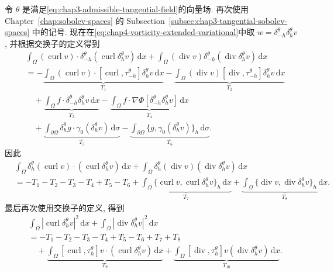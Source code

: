 \begin{Proof}
\begin{itemize}
令 $\theta$ 是满足\eqref{eq:chap3-admissible-tangential-field}的向量场. 再次使用 Chapter~\ref{chap:sobolev-spaces} 的 Subsection~\ref{subsec:chap3-tangential-sobolev-spaces} 中的记号. 现在在\eqref{eq:chap4-vorticity-extended-variational}中取 $w=\delta_{-h}^\theta\delta_h^\theta v$, 并根据交换子的定义得到
\begin{align*}
 &\int_\Omega(\operatorname{curl}v)\cdot\delta_{-h}^\theta(\operatorname{curl}\delta_h^\theta v)\,\mathrm dx
 +\int_\Omega(\operatorname{div}v)\delta_{-h}^\theta(\operatorname{div}\delta_h^\theta v)\,\mathrm dx\\
 &=-\underbrace{\int_\Omega(\operatorname{curl}v)\cdot[\operatorname{curl},\tau_{-h}^\theta]\delta_h^\theta v\,\mathrm dx}_{T_1}
 -\underbrace{\int_\Omega(\operatorname{div}v)[\operatorname{div},\tau_{-h}^\theta]\delta_h^\theta v\,\mathrm dx}_{T_2}\\
 &\quad+\underbrace{\int_\Omega f\cdot\delta_{-h}^\theta\delta_h^\theta v\,\mathrm dx}_{T_3}
 -\underbrace{\int_\Omega f\cdot\nabla\Phi[\delta_{-h}^\theta\delta_h^\theta v]\,\mathrm dx}_{T_4}\\
 &\quad+\underbrace{\int_{\partial\Omega}\delta_h^\theta g\cdot\gamma_0(\delta_h^\theta v)\,\mathrm d\sigma}_{T_5}
 -\underbrace{\int_{\partial\Omega}\{g,\gamma_0(\delta_h^\theta v)\}_h\,\mathrm d\sigma}_{T_6}.
\end{align*}
因此
\begin{align*}
 &\int_\Omega\delta_h^\theta(\operatorname{curl}v)\cdot(\operatorname{curl}\delta_h^\theta v)\,\mathrm dx
 +\int_\Omega\delta_h^\theta(\operatorname{div}v)(\operatorname{div}\delta_h^\theta v)\,\mathrm dx\\
 &=-T_1-T_2-T_3-T_4+T_5-T_6
 +\underbrace{\int_\Omega\{\operatorname{curl}v,\operatorname{curl}\delta_h^\theta v\}_h\,\mathrm dx}_{T_7}
 +\underbrace{\int_\Omega\{\operatorname{div}v,\operatorname{div}\delta_h^\theta v\}_h\,\mathrm dx}_{T_8}.
\end{align*}
最后再次使用交换子的定义, 得到
\begin{align*}
 &\int_\Omega|\operatorname{curl}\delta_h^\theta v|^2\,\mathrm dx
 +\int_\Omega|\operatorname{div}\delta_h^\theta v|^2\,\mathrm dx\\
 &=-T_1-T_2-T_3-T_4+T_5-T_6+T_7+T_8\\
 &\quad+\underbrace{\int_\Omega[\operatorname{curl},\tau_h^\theta]v\cdot
 (\operatorname{curl}\delta_h^\theta v)\,\mathrm dx}_{T_9}
 +\underbrace{\int_\Omega[\operatorname{div},\tau_h^\theta]v
 (\operatorname{div}\delta_h^\theta v)\,\mathrm dx}_{T_{10}}.
\end{align*}

\end{itemize}
\end{Proof}
